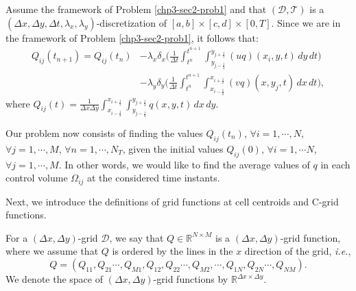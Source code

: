 \begin{prob}
	\label{chp3-sec2-prob2}
	Assume the framework of Problem \ref{chp3-sec2-prob1}
	and that $(\mathcal{D},\mathcal{T})$ is a $(\Delta x, \Delta y, \Delta t, \lambda_x,\lambda_y)$-discretization of $[a,b]\times [c,d]\times [0,T]$.
	Since we are in the framework of Problem \ref{chp3-sec2-prob1}, it follows that:
	\begin{align*}
		{Q}_{ij}(t_{n+1})  = {Q}_{ij}(t_{n})
		&- {\lambda_x}
		\delta _x \bigg( \frac{1}{\Delta t}
		\int_{t^n}^{t^{n+1}} \int_{y_{j-\frac{1}{2}}}^{y_{j+\frac{1}{2}}} 
		{(uq)}(x_{i}, y, t)
		\,dy \,dt \bigg) \\ \nonumber
		&- {\lambda_y}
		\delta _y \bigg( \frac{1}{\Delta t}
		\int_{t^n}^{t^{n+1}} \int_{x_{i-\frac{1}{2}}}^{x_{i+\frac{1}{2}}} 
		{(vq)}(x, y_{j}, t)
		\,dx \,dt \bigg),
	\end{align*}
	where ${Q}_{ij}(t) = \frac{1}{\Delta x \Delta y}
	\int_{x_{i-\frac{1}{2}}}^{x_{i+\frac{1}{2}}} 
	\int_{y_{j-\frac{1}{2}}}^{y_{j+\frac{1}{2}}} {q}(x,y,t) \,dx \,dy$.
	
	Our problem now consists of finding the values ${Q}_{ij}(t_{n})$, 
	$\forall i = 1, \cdots, N$, $\forall j = 1, \cdots, M$, $\forall n = 1, \cdots, N_T$,
    given the initial values ${Q}_{ij}(0)$, $\forall i = 1, \cdots N$, $\forall j = 1, \cdots, M$.
	In other words, we would like to find the average values of ${q}$
	in each control volume $\Omega_{ij}$ at the considered time instants.
\end{prob}
Next, we introduce the definitions of grid functions at cell centroids and C-grid functions. 
\begin{definition}
	\label{chp2-rmk-2d-gridfunction1}
	For a $(\Delta x,\Delta y)$-grid $\mathcal{D}$, we say that $Q \in \mathbb{R}^{N\times M}$ is a 
	$(\Delta x,\Delta y)$-grid function, where we assume that $Q$ is ordered by
	the lines in the $x$ direction of the grid, \textit{i.e.},
	\begin{equation*}
		Q = (Q_{11}, Q_{21} \cdots, Q_{M1}, Q_{12}, Q_{22} \cdots, Q_{M2}, \cdots,  Q_{1N}, Q_{2N} \cdots, Q_{NM}).
	\end{equation*}
	We denote the space of $(\Delta x,\Delta y)$-grid functions by $\mathbb{R}^{\Delta x \times \Delta y}$.
\end{definition}
	
